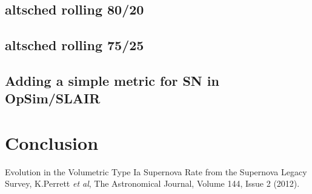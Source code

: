 \documentclass [11pt,a4paper]{article}
\begin{document}
\subsection{altsched rolling 80/20}

\subsection{altsched rolling 75/25}

\subsection{Adding a simple metric for SN in OpSim/SLAIR}

\section{ Conclusion}

\begin{thebibliography}{9}
 Evolution in the Volumetric Type Ia Supernova Rate from the Supernova Legacy Survey, K.Perrett {\it et al}, The Astronomical Journal, Volume 144, Issue 2 (2012).
  
 \end{thebibliography}

\clearpage


\appendix
  
\end{document}

